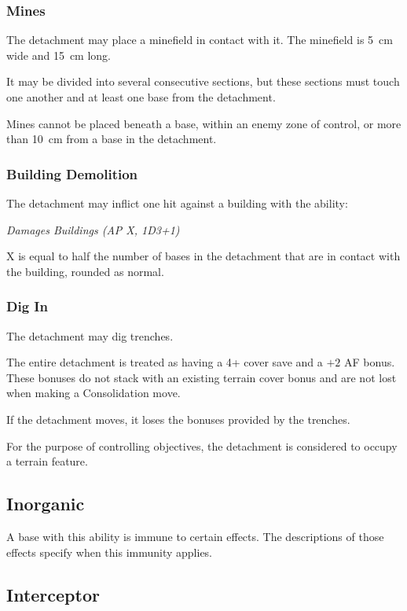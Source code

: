 \subsubsection{Mines}

The detachment may place a minefield in contact with it. The minefield is 5~cm wide and 15~cm long.

It may be divided into several consecutive sections, but these sections must touch one another and at least one base from the detachment.

Mines cannot be placed beneath a base, within an enemy zone of control, or more than 10~cm from a base in the detachment.

\subsubsection{Building Demolition}

The detachment may inflict one hit against a building with the ability:

\begin{center}
    \textit{Damages Buildings (AP X, 1D3+1)}
\end{center}

X is equal to half the number of bases in the detachment that are in contact with the building, rounded as normal.

\subsubsection{Dig In}

The detachment may dig trenches.

The entire detachment is treated as having a 4+ cover save and a $+2$ AF bonus. These bonuses do not stack with an existing terrain cover bonus and are not lost when making a Consolidation move.

If the detachment moves, it loses the bonuses provided by the trenches.

For the purpose of controlling objectives, the detachment is considered to occupy a terrain feature.

\subsection{Inorganic}

A base with this ability is immune to certain effects. The descriptions of those effects specify when this immunity applies.

\subsection{Interceptor}

